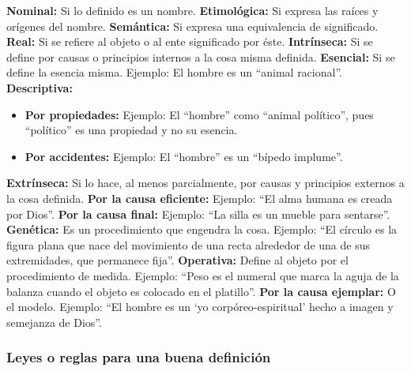 \documentclass{article}
\begin{document}
\begin{outline}[enumerate]
    \1 \textbf{Nominal:} Si lo definido es un nombre.
    \2 \textbf{Etimológica:} Si expresa las raíces y orígenes del nombre.
    \2 \textbf{Semántica:} Si expresa una equivalencia de significado.
    \1 \textbf{Real:} Si se refiere al objeto o al ente significado por éste.
    \2 \textbf{Intrínseca:} Si se define por causas o principios internos a la cosa misma definida.
    \3 \textbf{Esencial:} Si se define la esencia misma. Ejemplo: El hombre es un ``animal racional''.
    \3 \textbf{Descriptiva:}
    \begin{itemize}[label={$\bullet$}]
        \item \textbf{Por propiedades:} Ejemplo: El ``hombre'' como ``animal  político'', pues ``político'' es una propiedad y no su esencia.
        \item \textbf{Por accidentes:} Ejemplo: El ``hombre'' es un ``bípedo implume''.
    \end{itemize}
    \2 \textbf{Extrínseca:} Si lo hace, al menos parcialmente, por causas y principios externos a la cosa definida.
    \3 \textbf{Por la causa eficiente:} Ejemplo: ``El alma humana es creada por Dios''.
    \3 \textbf{Por la causa final:} Ejemplo: ``La silla es un mueble para sentarse''.
    \3 \textbf{Genética:} Es un procedimiento que engendra la cosa. Ejemplo: ``El círculo es la figura plana que nace del movimiento de una recta alrededor de una de sus extremidades, que permanece fija''.
    \3 \textbf{Operativa:} Define al objeto por el procedimiento de medida. Ejemplo: ``Peso es el numeral que marca la aguja de la balanza cuando el objeto es colocado en el platillo''.
    \3 \textbf{Por la causa ejemplar:} O el modelo. Ejemplo: ``El hombre es un `yo corpóreo-espiritual' hecho a imagen y semejanza de Dios''.
\end{outline}

\subsubsection{Leyes o reglas para una buena definición} 
    
\end{document}
